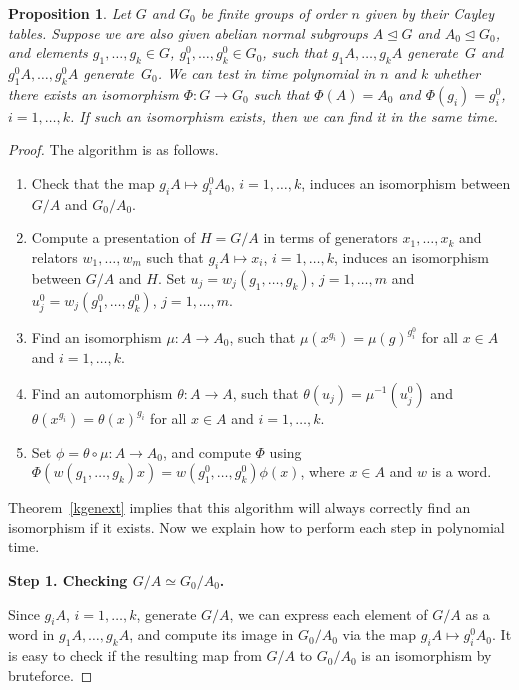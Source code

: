 \documentclass{article}
\newtheorem{proposition}[theorem]{Proposition}
\begin{document}
\begin{proposition}\label{findis}
	Let \( G \) and \( G_0 \) be finite groups of order \( n \) given by their Cayley tables.
	Suppose we are also given abelian normal subgroups \( A \unlhd G \) and \( A_0 \unlhd G_0 \),
	and elements \( g_1, \dots, g_k \in G \), \( g^0_1, \dots, g^0_k \in G_0 \), such that
	\( g_1A, \dots, g_kA \) generate~\( G \) and \( g^0_1A, \dots, g^0_kA \) generate~\( G_0 \).
	We can test in time polynomial in \( n \) and \( k \) whether there exists an isomorphism \( \Phi : G \to G_0 \) such that \( \Phi(A) = A_0 \)
	and \( \Phi(g_i) = g^0_i \), \( i = 1, \dots, k \). If such an isomorphism exists, then we can find it in the same time.
\end{proposition}
\begin{proof}
	The algorithm is as follows.
	\begin{enumerate}
		\item Check that the map \( g_iA \mapsto g_i^0A_0 \), \( i = 1, \dots, k \), induces an isomorphism between \( G/A \) and \( G_0/A_0 \).
		\item Compute a presentation of \( H = G/A \) in terms of generators \( x_1, \dots, x_k \) and relators \( w_1, \dots, w_m \)
			such that \( g_iA \mapsto x_i \), \( i = 1, \dots, k \), induces an isomorphism between \( G/A \) and \( H \).
			Set \( u_j = w_j(g_1, \dots, g_k) \), \( j = 1, \dots, m \) and \( u^0_j = w_j(g^0_1, \dots, g^0_k) \), \( j = 1, \dots, m \).
		\item Find an isomorphism \( \mu : A \to A_0 \), such that \( \mu(x^{g_i}) = \mu(g)^{g^0_i} \) for all \( x \in A \) and \( i = 1, \dots, k \).
		\item Find an automorphism \( \theta : A \to A \), such that \( \theta(u_j) = \mu^{-1}(u^0_j) \)
			and \( \theta(x^{g_i}) = \theta(x)^{g_i} \) for all \( x \in A \) and \( i = 1, \dots, k \).
		\item Set \( \phi = \theta \circ \mu : A \to A_0 \),
			and compute \( \Phi \) using \( \Phi(w(g_1, \dots, g_k)x) = w(g^0_1, \dots, g^0_k) \phi(x) \), where \( x \in A \) and \( w \) is a word.
	\end{enumerate}

	Theorem~\ref{kgenext} implies that this algorithm will always correctly find an isomorphism if it exists.
	Now we explain how to perform each step in polynomial time.%
	\medskip

	\noindent
	\textbf{Step 1. Checking \( G/A \simeq G_0/A_0 \).}
	\medskip

	Since \( g_iA \), \( i = 1, \dots, k \), generate \( G/A \), we can express each element of \( G/A \)
	as a word in \( g_1A, \dots, g_kA \), and compute its image in \( G_0/A_0 \) via the map \( g_iA \mapsto g_i^0A_0 \).
	It is easy to check if the resulting map from \( G/A \) to \( G_0/A_0 \) is an isomorphism by bruteforce.
	\medskip


\end{proof}
\end{document}
